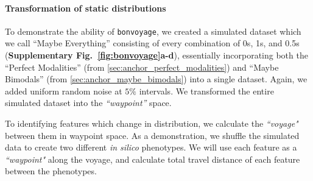
\paragraph{Transformation of static distributions}

To demonstrate the ability of \texttt{bonvoyage}, we created a simulated dataset which we call ``Maybe Everything'' consisting of every combination of 0s, 1s, and 0.5s (\textbf{Supplementary Fig.~\ref{fig:bonvoyage}a-d}), essentially incorporating both the ``Perfect Modalities'' (from \ref{sec:anchor_perfect_modalities}) and ``Maybe Bimodals'' (from \ref{sec:anchor_maybe_bimodals}) into a single dataset. Again, we added uniform random noise at $5\%$ intervals. We transformed the entire simulated dataset into the \emph{``waypoint''} space.




To identifying features which change in distribution, we calculate the \emph{``voyage"} between them in waypoint space. As a demonstration, we shuffle the simulated data to create two different \emph{in silico} phenotypes. We will use each feature as a \emph{``waypoint"} along the voyage, and calculate total travel distance of each feature between the phenotypes. %


